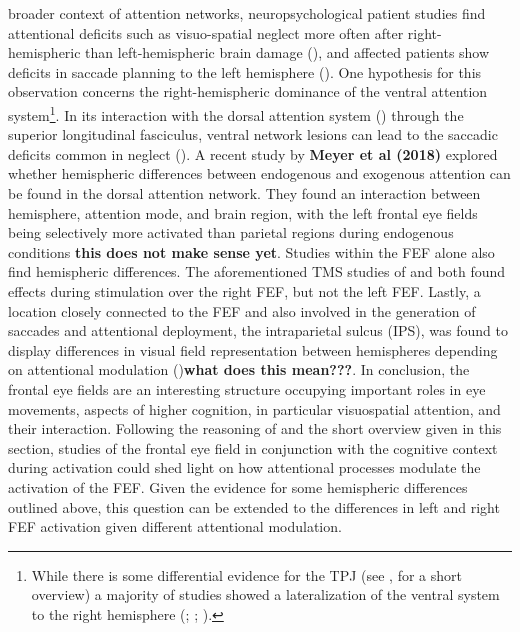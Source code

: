 \documentclass[a4paper, 12pt]{scrreprt}
\begin{document}
broader context of attention networks, neuropsychological patient studies find attentional deficits such as visuo-spatial neglect more often after right-hemispheric than left-hemispheric brain damage (\cite{vernet2014corrigendum}), and affected patients show deficits in saccade planning to the left hemisphere (\cite{Behrmann2001ImpairedIB}). One hypothesis for this observation concerns the right-hemispheric dominance of the ventral attention system\footnote{While there is some differential evidence for the TPJ (see \textcite{vossel2014dorsal}, for a short overview) a majority of studies showed a lateralization of the ventral system to the right hemisphere (\cite{corbetta2002control}; \cite{fox2006spontaneous}; \cite{corbetta2008reorienting}).}. In its interaction with the dorsal attention system (\cite{he2007breakdown}) through the superior longitudinal fasciculus, ventral network lesions can lead to the saccadic deficits common in neglect (\cite{friston2018neglect}). A recent study by \textbf{Meyer et al (2018)} explored whether hemispheric differences between endogenous and exogenous attention can be found  in the dorsal attention network. They found an interaction between hemisphere, attention mode, and brain region, with the left frontal eye fields being selectively more activated than parietal regions during endogenous conditions \textbf{this does not make sense yet}. Studies within the FEF alone also find hemispheric differences. The aforementioned TMS studies of  \textcite{muggleton2003human} and \textcite{grosbras2002transcranial}both found effects during stimulation over the right FEF, but not the left FEF. Lastly, a location closely connected to the FEF and also involved in the generation of saccades and attentional deployment, the intraparietal sulcus (IPS), was found to display differences in visual field representation between hemispheres depending on attentional modulation (\cite{sheremata2015hemisphere})\textbf{what does this mean???}.\newline
In conclusion, the frontal eye fields are an interesting structure occupying important roles in eye movements, aspects of higher cognition, in particular visuospatial attention, and their interaction. Following the reasoning of \textcite{vernet2014corrigendum} and the short overview given in this section, studies of the frontal eye field in conjunction with the cognitive context during activation could shed light on how attentional processes modulate the activation of the FEF. Given the evidence for some hemispheric differences outlined above, this question can be extended to the differences in left and right FEF activation given different attentional modulation.
\end{document}
